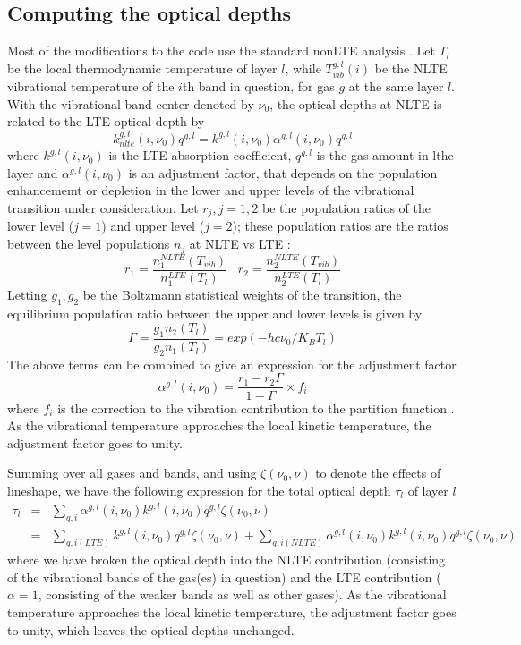 \documentclass[11pt]{article}
\begin{document}
\subsection{Computing the optical depths}
Most of the modifications to the code use the standard nonLTE analysis 
\cite{edw:93,edw:98,lop:01,kopra}. Let $T_{l}$ be the local thermodynamic
temperature of layer $l$, while $T_{vib}^{g,l}(i)$ be the NLTE vibrational 
temperature of the $i$th band in question, for gas $g$ at the same layer $l$.
With the vibrational band center denoted by $\nu_{0}$, the optical depths 
at NLTE is related to the LTE optical depth by \\
\[
k_{nlte}^{g,l}(i,\nu_0) q^{g,l} = 
      k^{g,l}(i,\nu_0) \alpha^{g,l}(i,\nu_0) q^{g,l}
\]
where $k^{g,l}(i,\nu_0)$ is the LTE absorption coefficient, $q^{g,l}$ is the
gas amount in lthe layer and $\alpha^{g,l}(i,\nu_0)$ is an
adjustment factor, that depends on the population enhancememt or depletion in
the lower and upper levels of the vibrational transition under consideration.
Let $r_{j}, j = 1,2$ be the population ratios of the lower level ($j=1$) and
upper level ($j=2$); these population ratios are the ratios between the 
level populations $n_{j}$ at NLTE vs LTE : 
\[
r_{1} = \frac{n_{1}^{NLTE}(T_{vib})}{n_{1}^{LTE}(T_{l})} \;\;\;
r_{2} = \frac{n_{2}^{NLTE}(T_{vib})}{n_{2}^{LTE}(T_{l})}
\]
Letting $g_1,g_2$ be the Boltzmann statistical weights of the transition, the
equilibrium population ratio between the upper and lower levels is given by
\cite{edw:93,lop:01}
\[
\Gamma = \frac{g_{1}n_{2}(T_{l})}{g_{2}n_{1}(T_{l})} = 
exp(-hc\nu_{0}/K_{B}T_{l})
\]
The above terms can be combined to \cite{edw:93,lop:01} give an expression for
the adjustment factor
\[
\alpha^{g,l}(i,\nu_0) = \frac{r_1 - r_2 \Gamma}{1 - \Gamma} \times f_{i}
\]
where $f_{i}$ is the correction to the vibration contribution to the partition 
function \cite{edw:93,edw:98}. As the vibrational temperature approaches the
local kinetic temperature, the adjustment factor goes to unity.

Summing over all gases and bands, and using $\zeta(\nu_{0},\nu)$ to denote
the effects of lineshape, we have the following expression for the 
total optical depth $\tau_{l}$ of layer $l$
\begin{eqnarray*}
\tau_{l} & = & 
 \sum_{g,i} \alpha^{g,l}(i,\nu_0) k^{g,l}(i,\nu_0) q^{g,l} \zeta(\nu_{0},\nu)\\
   & =  & \sum_{g,i(LTE)} k^{g,l}(i,\nu_0) q^{g,l} \zeta(\nu_{0},\nu) + 
    \sum_{g,i(NLTE)} \alpha^{g,l}(i,\nu_0) k^{g,l}(i,\nu_0) q^{g,l} 
                 \zeta(\nu_{0},\nu)
\end{eqnarray*}
where we have broken the optical depth into the NLTE contribution (consisting 
of the vibrational bands of the gas(es) in question) and the LTE contribution 
($\alpha = 1$, consisting of the weaker bands as well as other gases). 
As the vibrational temperature approaches the local kinetic temperature, the 
adjustment factor goes to unity, which leaves the optical depths unchanged.
\end{document}
